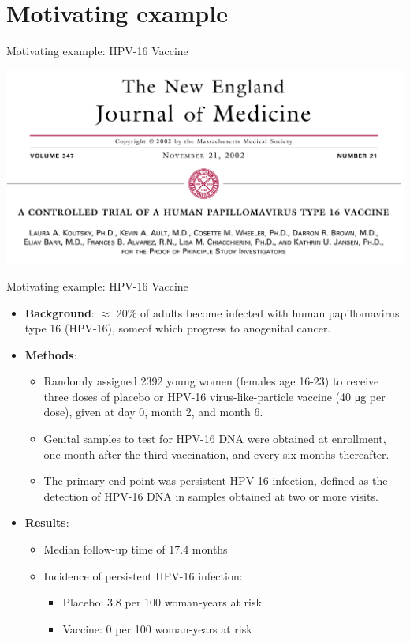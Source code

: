 \documentclass[10pt]{beamer}\usepackage[]{graphicx}\usepackage[]{color}
\begin{document}
\section{Motivating example}

\begin{frame}{Motivating example: HPV-16 Vaccine}
	
	\includegraphics[scale=0.35]{nejm_hpv.png}
	
\end{frame}


\begin{frame}{Motivating example: HPV-16 Vaccine}
	\footnotesize
	\begin{itemize}
		\item \textbf{Background}: $\approx$ 20\% of adults become infected with human papillomavirus type 16 (HPV-16), someof which progress to anogenital cancer. 
		\pause
		\item \textbf{Methods}: 
		\begin{itemize}
			\footnotesize
			\item Randomly assigned 2392 young women (females age 16-23) to receive three doses of placebo or HPV-16 virus-like-particle vaccine (40 μg per dose), given at day 0, month 2, and month 6. 
			\item Genital samples to test for HPV-16 DNA were obtained at enrollment,	one month after the third vaccination, and every six months thereafter. 
			\item The primary end point was persistent HPV-16 infection, defined as the detection of HPV-16 DNA in samples obtained at two or more visits. 
		\end{itemize}
		\pause 
		\item \textbf{Results}: \begin{itemize}
			\footnotesize
			\item Median follow-up time of 17.4 months
			\item Incidence of persistent HPV-16 infection: \begin{itemize}
				\footnotesize
				\item Placebo: 3.8 per 100 woman-years at risk
				\item Vaccine: 0 per 100 woman-years at risk
			\end{itemize}
		\end{itemize}
	\end{itemize}
\end{frame}
\end{document}
